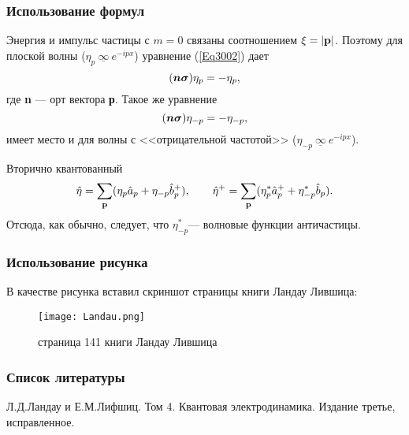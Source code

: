 \begin{frame}
\frametitle{\rmfamily Использование формул}
Энергия и импульс частицы с ${m = 0}$ связаны соотношением
${\xi = |{\bf p}|}$.  Поэтому для плоской волны (${\eta _p \:\underline{\infty}\: e^{-ipx}}$) уравнение
 (\ref{Eq3002}) дает    
 \begin{equation}
    (\mbox{\boldmath $n\sigma$})\eta_p = -\eta_p, \label{Eq3003}
 \end{equation}
где {\bf n} — орт вектора {\bf р}. Такое же уравнение
\begin{equation}
    (\mbox{\boldmath $n\sigma$})\eta_{-p} = -\eta_{-p}, \label{Eq3004}
\end{equation}
имеет место и для волны с <<отрицательной частотой>> 
(${\eta _{-p} \:\underline{\infty}\: e^{-ipx}}$).

Вторично квантованный 
\begin{equation}
    \hat \eta = \sum_{\bf p} (\eta_p \hat a_p + \eta_{-p}\hat b_p^+),       \qquad
    \hat \eta^+ = \sum_{\bf p} (\eta_p^* \hat a_p^+ + \eta_{-p}^*\hat b_p). \label{Eq3005}
\end{equation}
Отсюда, как обычно, следует, что $\eta_{-p}^*$— волновые функции античастицы.
\end{frame}
\begin{frame}
\frametitle{\rmfamily Использование рисунка}
В качестве рисунка вставил скриншот страницы книги Ландау Лившица:
\begin{figure}[h]
\centering\texttt{[image: Landau.png]}
\caption{страница 141 книги Ландау Лившица}
\label{fig:image}
\end{figure}
\end{frame}

\begin{frame}
\frametitle{\rmfamily Список литературы}
\begin{thebibliography}{9}
Л.Д.Ландау и Е.М.Лифшиц. Том 4. Квантовая электродинамика. Издание третье, исправленное.
\end{thebibliography}
\end{frame}